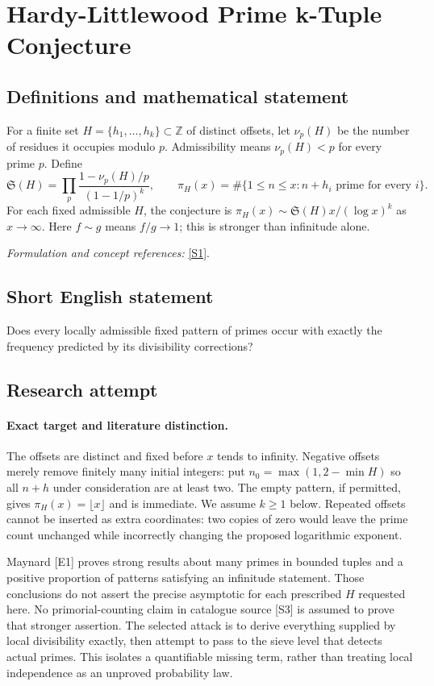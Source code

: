\documentclass[11pt]{article}
\begin{document}
\section*{\texorpdfstring{Hardy-Littlewood Prime k-Tuple Conjecture}{Hardy-Littlewood Prime k-Tuple Conjecture}}\label{30006682}
\subsection{Definitions and mathematical statement}
For a finite set $H=\{h_1,\ldots,h_k\}\subset{\mathbb{Z}}$ of distinct offsets, let $\nu_p(H)$ be the number of residues it occupies modulo $p$. Admissibility means $\nu_p(H)<p$ for every prime $p$. Define
\[
 \mathfrak S(H)=\prod_p\frac{1-\nu_p(H)/p}{(1-1/p)^k},\qquad
 \pi_H(x)=\#\{1\le n\le x:n+h_i\text{ prime for every }i\}.
\]
For each fixed admissible $H$, the conjecture is $\pi_H(x)\sim\mathfrak S(H)x/(\log x)^k$ as $x\to\infty$. Here $f\sim g$ means $f/g\to1$; this is stronger than infinitude alone.
\par\smallskip\textit{Formulation and concept references:} \href{https://mathworld.wolfram.com/k-TupleConjecture.html}{[S1]}.

\subsection{Short English statement}
Does every locally admissible fixed pattern of primes occur with exactly the frequency predicted by its divisibility corrections?
\subsection{Research attempt}

\paragraph{Exact target and literature distinction.}
The offsets are distinct and fixed before $x$ tends to infinity. Negative
offsets merely remove finitely many initial integers: put
$n_0=\max(1,2-\min H)$ so all $n+h$ under consideration are at least two.
The empty pattern, if permitted, gives $\pi_H(x)=\lfloor x\rfloor$ and
is immediate. We assume $k\ge1$ below. Repeated offsets cannot be inserted
as extra coordinates: two copies of zero would leave the prime count
unchanged while incorrectly changing the proposed logarithmic exponent.

Maynard [E1] proves strong results about many primes in bounded tuples
and a positive proportion of patterns satisfying an infinitude statement.
Those conclusions do not assert the precise asymptotic for each prescribed
$H$ requested here. No primorial-counting claim in catalogue source [S3]
is assumed to prove that stronger assertion. The selected attack is to
derive everything supplied by local divisibility exactly, then attempt
to pass to the sieve level that detects actual primes. This isolates a
quantifiable missing term, rather than treating local independence as an
unproved probability law.
\end{document}
